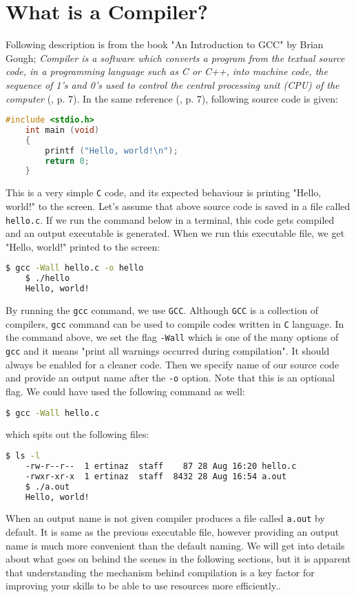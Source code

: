 \section{What is a Compiler?}
Following description is from the book "An Introduction to GCC" by Brian Gough;
\textit{Compiler is a software which converts a program from the textual source code, 
in a programming language such as C or C++, into machine code, the sequence 
of  1’s and 0’s used to control the central processing unit (CPU) of the computer}
(\cite{gough2004}, p. 7).
\newline \newline
In the same reference (\cite{gough2004}, p. 7), following source code is given:
\begin{lstlisting}[language=C]
    #include <stdio.h>
    int main (void)
    {
        printf ("Hello, world!\n");
        return 0; 
    }
\end{lstlisting}
This is a very simple \texttt{C} code, and its expected behaviour is printing 
"Hello, world!" to the screen. Let's assume that above source code is saved in a file 
called \texttt{hello.c}. If we run the command below in a terminal, this code gets
compiled and an output executable is generated. When we run this executable file, 
we get "Hello, world!" printed to the screen:
\begin{lstlisting}[language=bash]
    $ gcc -Wall hello.c -o hello
    $ ./hello
    Hello, world!
\end{lstlisting} 
By running the \texttt{gcc} command, we use \texttt{GCC}. Although \texttt{GCC} is a 
collection of compilers, \texttt{gcc} command can be used to compile codes written in 
\texttt{C} language. 
\newline
\newline
In the command above, we set the flag \texttt{-Wall} which is one of the many options of 
\texttt{gcc} and it means "print all warnings occurred during compilation". It should 
always be enabled for a cleaner code. Then we specify name of our source code and provide 
an output name after the \texttt{-o} option. Note that this is an optional flag. 
We could have used the following command as well:
\begin{lstlisting}[language=bash]
    $ gcc -Wall hello.c
\end{lstlisting} 
which spits out the following files:
\begin{lstlisting}[language=bash]
    $ ls -l
    -rw-r--r--  1 ertinaz  staff    87 28 Aug 16:20 hello.c
    -rwxr-xr-x  1 ertinaz  staff  8432 28 Aug 16:54 a.out
    $ ./a.out
    Hello, world!
\end{lstlisting} 
When an output name is not given compiler produces a file called \texttt{a.out} by 
default. It is same as the previous executable file, however providing an output name 
is much more convenient than the default naming.
\newline \newline
We will get into details about what goes on behind the scenes in the following
sections, but it is apparent that understanding the mechanism behind compilation
is a key factor for improving your skills to be able to use resources more efficiently..

